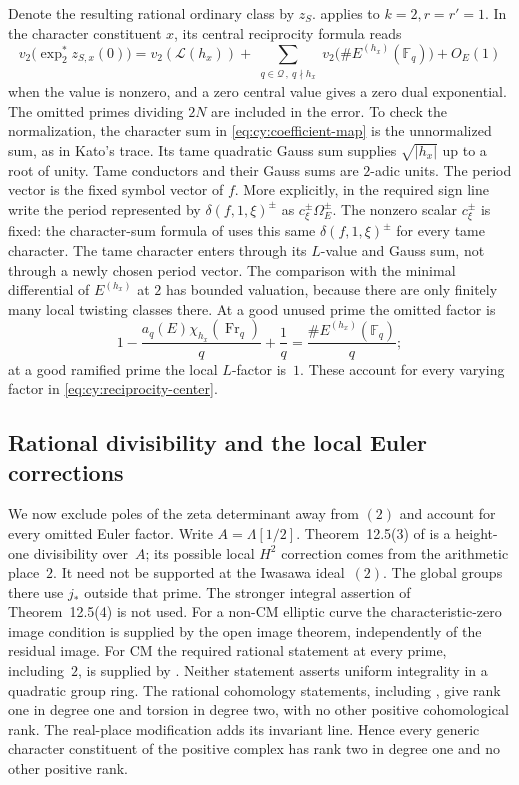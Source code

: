 Denote the resulting rational ordinary class by $z_S$.  \citet[Theorem~9.7]{Kato2004} applies to $k=2,r=r'=1$.  In the character constituent
$x$, its central reciprocity formula reads
\begin{equation}\label{eq:cy:reciprocity-center}
 v_2\bigl(\exp_2^*z_{S,x}(0)\bigr)
 =v_2(\mathcal L(h_x))+
  \sum_{\substack{q\in\mathcal Q\,,\ q\nmid h_x}}
       v_2\bigl(\#E^{(h_x)}(\mathbb F _q)\bigr)+O_E(1)
\end{equation}
when the value is nonzero, and a zero central value gives a zero dual
exponential.  The omitted primes dividing $2N$ are included in the error.
To check the normalization, the character sum in
\eqref{eq:cy:coefficient-map} is the unnormalized sum, as in Kato's trace.
Its tame quadratic Gauss sum supplies $\sqrt{|h_x|}$ up to a root of
unity.  Tame conductors and their Gauss sums are $2$-adic units.  The
period vector is the fixed symbol vector of $f$.  More explicitly,
in the required sign line write the period represented by
$\delta(f,1,\xi)^{\pm}$ as $c_\xi^{\pm}\Omega_E^{\pm}$.
The nonzero scalar $c_\xi^{\pm}$ is fixed: the character-sum formula
of \cite[Theorem~6.6]{Kato2004} uses this same $\delta(f,1,\xi)^{\pm}$
for every tame character.  The tame character enters through its
$L$-value and Gauss sum, not through a newly chosen period vector.
The comparison with the minimal differential of $E^{(h_x)}$ at $2$ has bounded valuation,
because there are only finitely many local twisting classes there.
At a good unused prime the omitted factor is
\[
 1-\frac{a_q(E)\chi_{h_x}(\operatorname{Fr}_q)}q+\frac1q
       =\frac{\#E^{(h_x)}(\mathbb F _q)}q;
\]
at a good ramified prime the local $L$-factor is~$1$.  These account for
every varying factor in \eqref{eq:cy:reciprocity-center}.

\subsection{Rational divisibility and the local Euler corrections}

We now exclude poles of the zeta determinant away from $(2)$ and
account for every omitted Euler factor.  Write $A=\Lambda[1/2]$.  Theorem~12.5(3) of
\cite{Kato2004} is a height-one divisibility over~$A$; its possible local
$H^2$ correction comes from the arithmetic place~$2$. It need not be
supported at the Iwasawa ideal~$(2)$. The global groups
there use $j_*$ outside that prime.  The stronger integral assertion of
Theorem~12.5(4) is not used.  For a non-CM elliptic curve the characteristic-zero
image condition is supplied by the open image theorem, independently of
the residual image.  For CM the required rational statement at every
prime, including~$2$, is supplied by
\cite[Theorem~2.6 and Remark~2.7]{BurungaleTian2026}.  Neither statement
asserts uniform integrality in a quadratic group ring. The rational
cohomology statements, including \citet[Theorem~12.4]{Kato2004}, give rank one in degree one and torsion in degree
two, with no other positive cohomological rank. The real-place
modification adds its invariant line. Hence every generic character
constituent of the positive complex has rank two in degree one and no
other positive rank.

